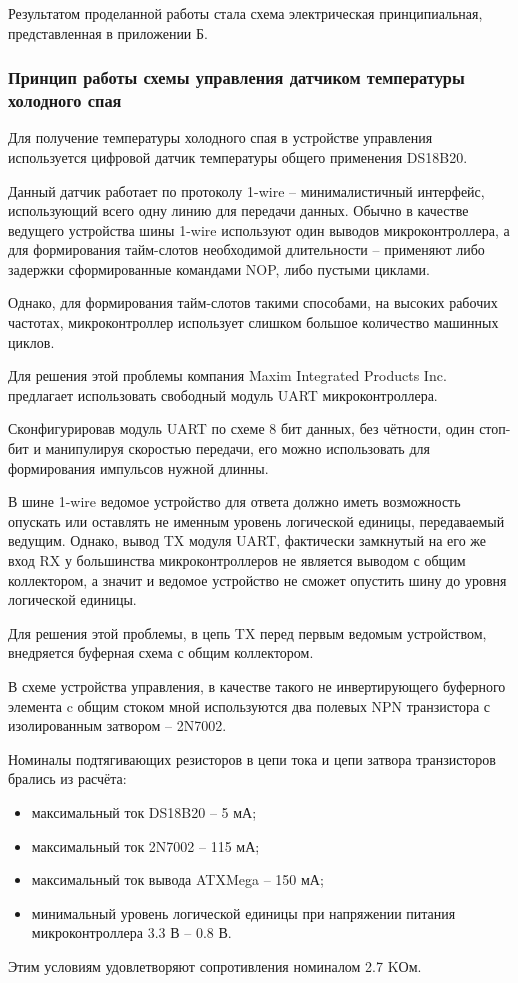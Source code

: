 Результатом проделанной работы стала схема электрическая принципиальная,
представленная в приложении Б.


\subsubsection{Принцип работы схемы управления датчиком температуры холодного спая}
Для получение температуры холодного спая в устройстве управления используется цифровой датчик
температуры общего применения DS18B20.

Данный датчик работает по протоколу 1-wire -- минималистичный интерфейс, использующий
всего одну линию для передачи данных. Обычно в качестве ведущего устройства
шины 1-wire используют один выводов микроконтроллера, а для формирования
тайм-слотов необходимой длительности -- применяют либо задержки сформированные
командами NOP, либо пустыми циклами.


Однако, для формирования тайм-слотов такими способами, на высоких рабочих
частотах, микроконтроллер использует слишком большое количество машинных циклов.


Для решения этой проблемы компания Maxim Integrated Products Inc.
предлагает использовать \cite{max2usart} свободный модуль UART микроконтроллера.


Сконфигурировав модуль UART по схеме 8 бит данных, без чётности, один стоп-бит и
манипулируя скоростью передачи, его можно использовать для формирования
импульсов нужной длинны.


В шине 1-wire ведомое устройство для ответа должно иметь возможность
опускать или оставлять не именным уровень логической единицы,
передаваемый ведущим.
Однако, вывод TX модуля UART, фактически замкнутый на его же вход RX у большинства
микроконтроллеров не является выводом с общим коллектором, а значит и ведомое
устройство не сможет опустить шину до уровня логической единицы.

Для решения этой проблемы, в цепь TX перед первым ведомым устройством, внедряется
буферная схема с общим коллектором.

В схеме устройства управления, в качестве такого не инвертирующего буферного
элемента c общим стоком мной используются два полевых NPN транзистора с изолированным
затвором -- 2N7002.

Номиналы подтягивающих резисторов в цепи тока и цепи затвора транзисторов брались из расчёта:
\begin{itemize}
	\item максимальный ток DS18B20 -- 5 мА;
	\item максимальный ток 2N7002 -- 115 мА;
	\item максимальный ток вывода ATXMega -- 150 мА;
	\item минимальный уровень логической единицы при напряжении
		питания микроконтроллера 3.3 В -- 0.8 В.
\end{itemize}
Этим условиям удовлетворяют сопротивления номиналом 2.7 KОм.


